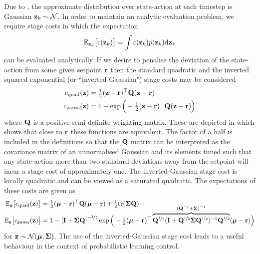 Due to , the approximate distribution over state-action at each timestep is Gaussian $\mathbf{z}_k \sim \mathcal{N}$. In order to maintain an analytic evaluation problem, we require stage costs in which the expectation
\begin{equation} \label{eqn:costint}
\mathbb{E}_{\mathbf{z}_k}\big[c(\mathbf{z}_k)\big] = \int c(\mathbf{z}_k)p(\mathbf{z}_k)\mathrm{d}\mathbf{z}_k
\end{equation}
can be evaluated analytically. If we desire to penalise the deviation of the state-action from some given setpoint $\mathbf{r}$ then the standard quadratic and the inverted squared exponential (or ``inverted-Gaussian") stage costs may be considered
\begin{align}
c_{\text{quad}}(\mathbf{z}) &= \tfrac{1}{2}(\mathbf{z} - \mathbf{r})^\top\mathbf{Q}(\mathbf{z} - \mathbf{r}) \label{eqn:cost_quad} \\
c_{\text{gauss}}(\mathbf{z}) &= 1 - \exp\Big( - \tfrac{1}{2}(\mathbf{z} - \mathbf{r})^\top\mathbf{Q}(\mathbf{z}-\mathbf{r})\Big) \label{eqn:cost_gauss}
\end{align}
where $\mathbf{Q}$ is a positive semi-definite weighting matrix. These are depicted in  which shows that close to $\mathbf{r}$ these functions are equivalent. The factor of a half is included in the definitions so that the $\mathbf{Q}$ matrix can be interpreted as the covariance matrix of an unnormalised Gaussian and its elements tuned such that any state-action more than two standard-deviations away from the setpoint will incur a stage cost of approximately one. The inverted-Gaussian stage cost is locally quadratic and can be viewed as a saturated quadratic. The expectations of these costs are given as
\begin{align}
\mathbb{E}_{\mathbf{z}}\big[c_{\text{quad}}(\mathbf{z})\big] &= \tfrac{1}{2}(\boldsymbol{\mu} - \mathbf{r})^\top\mathbf{Q}(\boldsymbol{\mu} - \mathbf{r}) + \tfrac{1}{2}\text{tr}(\boldsymbol{\Sigma}\mathbf{Q})
\label{eqn:Equad} \\[-0.3cm]
\mathbb{E}_{\mathbf{z}}\big[c_{\text{gauss}}(\mathbf{z})\big] &= 1 - \big|\mathbf{I} + \boldsymbol{\Sigma}\mathbf{Q}\big|^{-\nicefrac{1}{2}}
\exp\Big( -\tfrac{1}{2}(\boldsymbol{\mu} - \mathbf{r})^\top
\overbrace{ \mathbf{Q}^{\nicefrac{1}{2}}(\mathbf{I} + \mathbf{Q}^{\nicefrac{1}{2}}\boldsymbol{\Sigma}\mathbf{Q}^{\nicefrac{1}{2}})^{-1}\mathbf{Q}^{\nicefrac{1}{2}} }^{(\mathbf{Q}^{-1} + \boldsymbol{\Sigma})^{-1}}
(\boldsymbol{\mu} - \mathbf{r})  \Big) \label{eqn:Egauss}
\end{align}
for $\mathbf{z} \sim \mathcal{N}(\boldsymbol{\mu},\boldsymbol{\Sigma})$. The use of the inverted-Gaussian stage cost leads to a useful behaviour in the context of probabilistic learning control.







